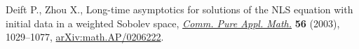 Deift P., Zhou X., Long-time asymptotics for solutions of the {NLS} equation
 with initial data in a weighted {S}obolev space, \href{https://doi.org/10.1002/cpa.3034}{\textit{Comm. Pure Appl.
 Math.}} \textbf{56} (2003), 1029--1077, \href{https://arxiv.org/abs/math.AP/0206222}{arXiv:math.AP/0206222}.
